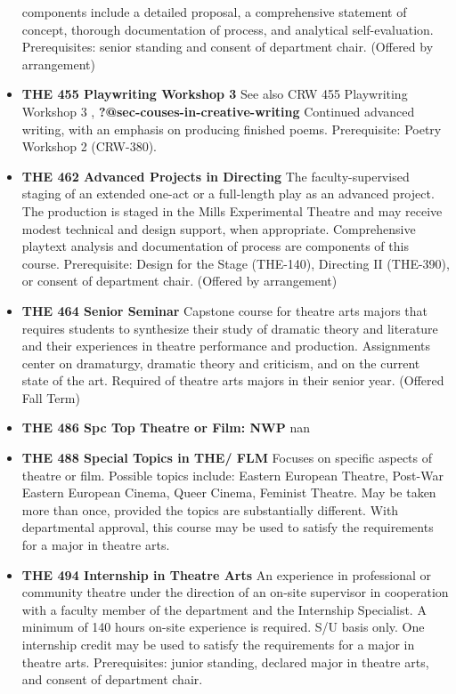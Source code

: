 \documentclass[
  letterpaper,
]{scrbook}
\begin{document}
\begin{itemize}
  components include a detailed proposal, a comprehensive statement of
  concept, thorough documentation of process, and analytical
  self-evaluation. Prerequisites: senior standing and consent of
  department chair. (Offered by arrangement)\\
\item
  \textbf{THE 455 Playwriting Workshop 3} See also CRW 455 Playwriting
  Workshop 3 , \textbf{?@sec-couses-in-creative-writing} Continued
  advanced writing, with an emphasis on producing finished poems.
  Prerequisite: Poetry Workshop 2 (CRW-380).
\item
  \textbf{THE 462 Advanced Projects in Directing} The faculty-supervised
  staging of an extended one-act or a full-length play as an advanced
  project. The production is staged in the Mills Experimental Theatre
  and may receive modest technical and design support, when appropriate.
  Comprehensive playtext analysis and documentation of process are
  components of this course. Prerequisite: Design for the Stage
  (THE-140), Directing II (THE-390), or consent of department chair.
  (Offered by arrangement)\\
\item
  \textbf{THE 464 Senior Seminar} Capstone course for theatre arts
  majors that requires students to synthesize their study of dramatic
  theory and literature and their experiences in theatre performance and
  production. Assignments center on dramaturgy, dramatic theory and
  criticism, and on the current state of the art. Required of theatre
  arts majors in their senior year. (Offered Fall Term)
\item
  \textbf{THE 486 Spc Top Theatre or Film: NWP} nan\\
\item
  \textbf{THE 488 Special Topics in THE/ FLM} Focuses on specific
  aspects of theatre or film. Possible topics include: Eastern European
  Theatre, Post-War Eastern European Cinema, Queer Cinema, Feminist
  Theatre. May be taken more than once, provided the topics are
  substantially different. With departmental approval, this course may
  be used to satisfy the requirements for a major in theatre arts.
\item
  \textbf{THE 494 Internship in Theatre Arts} An experience in
  professional or community theatre under the direction of an on-site
  supervisor in cooperation with a faculty member of the department and
  the Internship Specialist. A minimum of 140 hours on-site experience
  is required. S/U basis only. One internship credit may be used to
  satisfy the requirements for a major in theatre arts. Prerequisites:
  junior standing, declared major in theatre arts, and consent of
  department chair.
\end{itemize}
\end{document}
